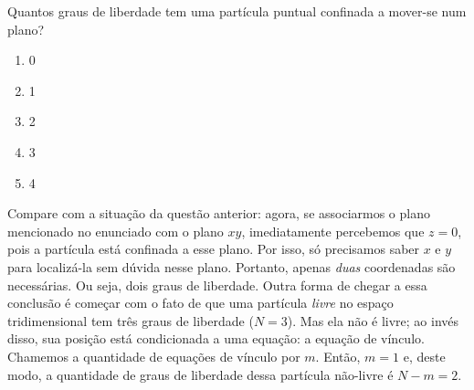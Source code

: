 \begin{question}
    Quantos graus de liberdade tem uma partícula puntual confinada a mover-se num plano?
    \begin{enumerate}
      \item 0
      \item 1
      \item 2 \rightanswer
      \item 3
      \item 4
    \end{enumerate}

    \begin{solution}
      Compare com a situação da questão anterior: agora, se associarmos o plano mencionado no enunciado com o plano $xy$, imediatamente percebemos que $z = 0$, pois a partícula está confinada a esse plano.
      Por isso, só precisamos saber $x$ e $y$ para localizá-la sem dúvida nesse plano.
      Portanto, apenas \emph{duas} coordenadas são necessárias.
      Ou seja, dois graus de liberdade.
      Outra forma de chegar a essa conclusão é começar com o fato de que uma partícula \emph{livre} no espaço tridimensional tem três graus de liberdade ($N = 3$).
      Mas ela não é livre; ao invés disso, sua posição está condicionada a uma equação: a equação de vínculo.
      Chamemos a quantidade de equações de vínculo por $m$.
      Então, $m = 1$ e, deste modo, a quantidade de graus de liberdade dessa partícula não-livre é $N - m = 2$.
    \end{solution}
\end{question}